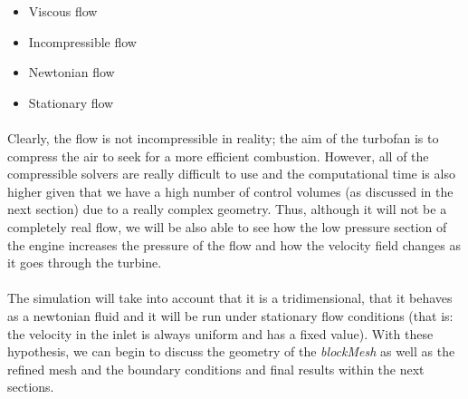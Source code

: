 \begin{itemize}
	\item Viscous flow
	\item Incompressible flow
	\item Newtonian flow
	\item Stationary flow
\end{itemize}

\paragraph{}Clearly, the flow is not incompressible in reality; the aim of the turbofan is to compress the air to seek for a more efficient combustion. However, all of the compressible solvers are really difficult to use and the computational time is also higher given that we have a high number of control volumes (as discussed in the next section) due to a really complex geometry. Thus, although it will not be a completely real flow, we will be also able to see how the low pressure section of the engine increases the pressure of the flow and how the velocity field changes as it goes through the turbine.

\paragraph{}The simulation will take into account that it is a tridimensional, that it behaves as a newtonian fluid and it will be run under stationary flow conditions (that is: the velocity in the inlet is always uniform and has a fixed value). With these hypothesis, we can begin to discuss the geometry of the \textit{blockMesh} as well as the refined mesh and the boundary conditions and final results within the next sections.